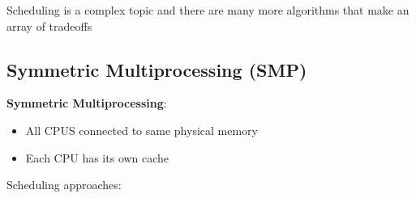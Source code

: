 \documentclass[../notes.tex]{subfiles}
\begin{document}
Scheduling is a complex topic and there are many more algorithms that make an array of tradeoffs


\subsection{Symmetric Multiprocessing (SMP)}

\begin{definition}
    \textbf{Symmetric Multiprocessing}:

\begin{itemize}
    \item All CPUS connected to same physical memory
    \item Each CPU has its own cache

\end{itemize}
\end{definition}


Scheduling approaches:
\end{document}

